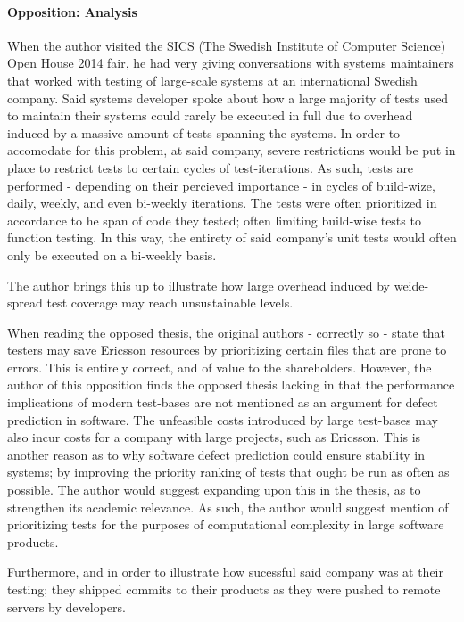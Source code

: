 
\paragraph{Opposition: Analysis}
\label{par:oppositionanalysis}
When the author visited the SICS (The Swedish Institute of Computer Science) Open House 2014 fair, he had very giving conversations with systems maintainers that worked with testing of large-scale systems at an international Swedish company.
Said systems developer spoke about how a large majority of tests used to maintain their systems could rarely be executed in full due to overhead induced by a massive amount of tests spanning the systems.
In order to accomodate for this problem, at said company, severe restrictions would be put in place to restrict tests to certain cycles of test-iterations.
As such, tests are performed - depending on their percieved importance - in cycles of build-wize, daily, weekly, and even bi-weekly iterations.
The tests were often prioritized in accordance to he span of code they tested; often limiting build-wise tests to function testing.
In this way, the entirety of said company's unit tests would often only be executed on a bi-weekly basis.

The author brings this up to illustrate how large overhead induced by weide-spread test coverage may reach unsustainable levels. 

When reading the opposed thesis, the original authors - correctly so - state that testers may save Ericsson resources by prioritizing certain files that are prone to errors.
This is entirely correct, and of value to the shareholders.
However, the author of this opposition finds the opposed thesis lacking in that the performance implications of modern test-bases are not mentioned as an argument for defect prediction in software.
The unfeasible costs introduced by large test-bases may also incur costs for a company with large projects, such as Ericsson.
This is another reason as to why software defect prediction could ensure stability in systems; by improving the priority ranking of tests that ought be run as often as possible.
The author would suggest expanding upon this in the thesis, as to strengthen its academic relevance.
As such, the author would suggest mention of prioritizing tests for the purposes of computational complexity in large software products.

Furthermore, and in order to illustrate how sucessful said company was at their testing; they shipped commits to their products as they were pushed to remote servers by developers.
